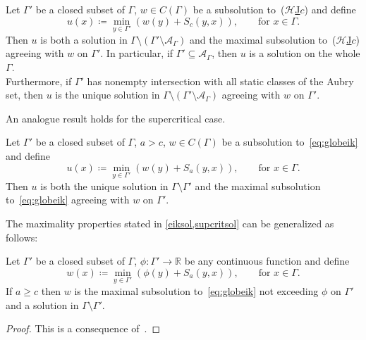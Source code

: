 \documentclass[11pt,a4paper,american]{article}
\newcommand{\Acal}{\mathcal A}
\newcommand{\Hcal}{\mathcal H}
\newcommand{\Rds}{\mathds R}
\newcommand{\hrefc}{\textup{(}\hyperref[eq:globeik]{\ensuremath{\Hcal}\textup{J}\ensuremath{c}}\textup{)}}
\begin{document}
    \begin{theo}\label{eiksol}
        Let $\Gamma'$ be a closed subset of $\Gamma$, $w\in C(\Gamma)$ be a subsolution to~\hrefc{} and define
        \begin{equation*}
            u(x)\coloneqq\min_{y\in\Gamma'}(w(y)+S_c(y,x)),\qquad\text{for }x\in\Gamma.
        \end{equation*}
        Then $u$ is both a solution in $\Gamma\setminus(\Gamma'\setminus\Acal_\Gamma)$ and the maximal subsolution to~\hrefc{} agreeing with $w$ on $\Gamma'$. In particular, if $\Gamma'\subseteq\Acal_\Gamma$, then $u$ is a solution on the whole $\Gamma$.\\
        Furthermore, if $\Gamma'$ has nonempty intersection with all static classes of the Aubry set, then $u$ is the unique solution in $\Gamma\setminus(\Gamma'\setminus\Acal_\Gamma)$ agreeing with $w$ on $\Gamma'$.
    \end{theo}

    An analogue result holds for the supercritical case.

    \begin{theo}\label{supcritsol}
        \emph{\cite[Theorem 7.9(ii)]{SiconolfiSorrentino18}} Let $\Gamma'$ be a closed subset of $\Gamma$, $a>c$, $w\in C(\Gamma)$ be a subsolution to~\cref{eq:globeik} and define
        \begin{equation*}
            u(x)\coloneqq\min_{y\in\Gamma'}(w(y)+S_a(y,x)),\qquad\text{for }x\in\Gamma.
        \end{equation*}
        Then $u$ is both the unique solution in $\Gamma\setminus\Gamma'$ and the maximal subsolution to~\cref{eq:globeik} agreeing with $w$ on $\Gamma'$.
    \end{theo}

    The maximality properties stated in \cref{eiksol,supcritsol} can be generalized as follows:

    \begin{theo}\label{maxsubsol}
        Let $\Gamma'$ be a closed subset of $\Gamma$, $\phi:\Gamma'\to\Rds$ be any continuous function and define
        \begin{equation*}
            w(x)\coloneqq\min_{y\in\Gamma'}(\phi(y)+S_a(y,x)),\qquad\text{for }x\in\Gamma.
        \end{equation*}
        If $a\ge c$ then $w$ is the maximal subsolution to~\cref{eq:globeik} not exceeding $\phi$ on $\Gamma'$ and a solution in $\Gamma\setminus\Gamma'$.
    \end{theo}
    \begin{proof}
        This is a consequence of~\cite{SiconolfiSorrentino18}.
    \end{proof}
\end{document}
